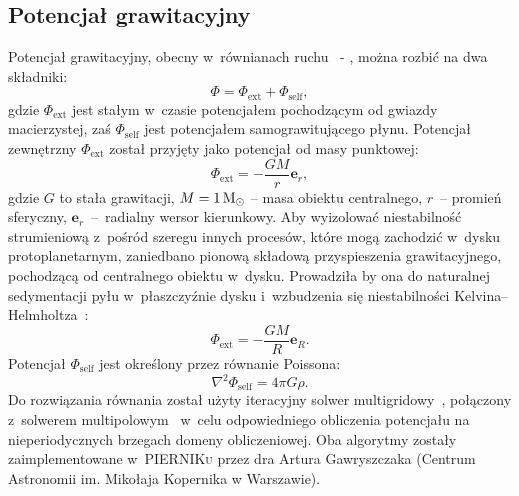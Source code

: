 \subsection{Potencjał grawitacyjny}
Potencjał grawitacyjny, obecny w~równianach ruchu~ - , można
rozbić na dwa składniki:
\begin{equation}
   \Phi = \Phi_{\textrm{ext}} + \Phi_{\textrm{self}},
\end{equation}
gdzie $\Phi_{\textrm{ext}}$ jest stałym w~czasie potencjałem pochodzącym od
gwiazdy macierzystej, zaś $\Phi_{\textrm{self}}$ jest potencjałem samograwitującego
płynu. Potencjał zewnętrzny $\Phi_{\textrm{ext}}$ został przyjęty jako potencjał
od masy punktowej:
\begin{equation}
   \Phi_{\textrm{ext}} = -\frac{GM}{r} \mathbf{e}_r,
\end{equation}
gdzie $G$ to stała grawitacji, $M = 1\hbox{$\mathrm{\thinspace M_{\odot}}$}$ -- masa obiektu centralnego, $r$~--
promień sferyczny, $\mathbf{e}_r$~--~radialny wersor kierunkowy.
Aby wyizolować niestabilność strumieniową z~pośród szeregu innych procesów,
które mogą zachodzić w~dysku protoplanetarnym, zaniedbano pionową składową
przyspieszenia grawitacyjnego, pochodzącą od centralnego obiektu w~dysku.
Prowadziła by ona do naturalnej sedymentacji pyłu w~płaszczyźnie dysku
i~wzbudzenia się niestabilności Kelvina--Helmholtza~\cite{JHK06}:
\begin{equation}\label{eq:phiext}
   \Phi_{\textrm{ext}} = -\frac{GM}{R} \mathbf{e}_R.
\end{equation}
%
Potencjał $\Phi_{\textrm{self}}$ jest określony przez równanie Poissona:
\begin{equation}\label{eq:poisson}
   \nabla^2 \Phi_{\textrm{self}} = 4\pi G \rho.
\end{equation}
Do rozwiązania równania  został użyty iteracyjny solwer
multigridowy~\citep{HG00}, połączony z~solwerem multipolowym~\citep{J77} w~celu
odpowiedniego obliczenia potencjału na nieperiodycznych brzegach domeny
obliczeniowej. Oba algorytmy zostały zaimplementowane w~\textsc{PIERNIKu} przez dra
Artura Gawryszczaka (Centrum Astronomii im. Mikołaja Kopernika w Warszawie).

